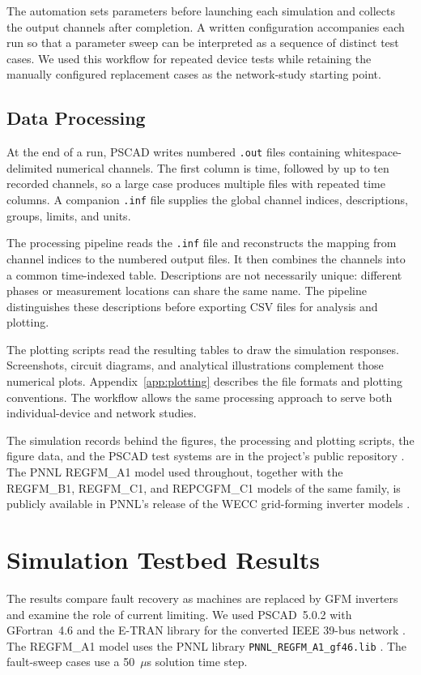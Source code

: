 \documentclass[11pt]{article}
\begin{document}
The automation sets parameters before launching each simulation and collects the output channels after completion. A written configuration accompanies each run so that a parameter sweep can be interpreted as a sequence of distinct test cases. We used this workflow for repeated device tests while retaining the manually configured replacement cases as the network-study starting point.

\subsection{Data Processing}
\label{sec:pipeline}
At the end of a run, PSCAD writes numbered \texttt{.out} files containing whitespace-delimited numerical channels. The first column is time, followed by up to ten recorded channels, so a large case produces multiple files with repeated time columns. A companion \texttt{.inf} file supplies the global channel indices, descriptions, groups, limits, and units.

The processing pipeline reads the \texttt{.inf} file and reconstructs the mapping from channel indices to the numbered output files. It then combines the channels into a common time-indexed table. Descriptions are not necessarily unique: different phases or measurement locations can share the same name. The pipeline distinguishes these descriptions before exporting CSV files for analysis and plotting.

The plotting scripts read the resulting tables to draw the simulation responses. Screenshots, circuit diagrams, and analytical illustrations complement those numerical plots. Appendix~\ref{app:plotting} describes the file formats and plotting conventions. The workflow allows the same processing approach to serve both individual-device and network studies.

The simulation records behind the figures, the processing and plotting scripts, the figure data, and the PSCAD test systems are in the project's public repository \cite{ut26xrepo}. The PNNL REGFM\_A1 model used throughout, together with the REGFM\_B1, REGFM\_C1, and REPCGFM\_C1 models of the same family, is publicly available in PNNL's release of the WECC grid-forming inverter models \cite{pnnlgithub}.

\section{Simulation Testbed Results}
\label{sec:emt}
The results compare fault recovery as machines are replaced by GFM inverters and examine the role of current limiting. We used PSCAD~5.0.2 with GFortran~4.6 and the E-TRAN library for the converted IEEE 39-bus network \cite{etranlib}. The REGFM\_A1 model uses the PNNL library \texttt{PNNL\_REGFM\_A1\_gf46.lib} \cite{regfma1lib}. The fault-sweep cases use a 50~$\mu$s solution time step.
\end{document}
